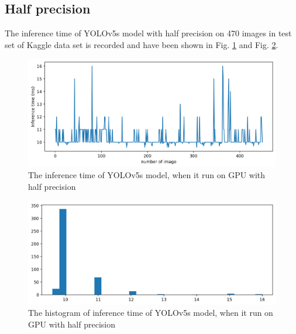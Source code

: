 \documentclass[12pt,a4paper]{article}
\begin{document}
\subsection*{Half precision}
The inference time of YOLOv5s model with half precision on 470 images in test set of Kaggle data set is recorded and have been shown in Fig. \ref{fig: gpush} and Fig. \ref{fig: gpush_hist}.
\begin{figure}[H]
    \centering
    \includegraphics[width=15cm]{figures/Inftime_yolov5s_half.png}
    \caption{The inference time of YOLOv5s model, when it run on GPU with half precision}
    \label{fig: gpush}
\end{figure}
\begin{figure}[H]
    \centering
    \includegraphics[width=15cm]{figures/Inftime_yolov5s_half_hist.png}
    \caption{The histogram of inference time of YOLOv5s model, when it run on GPU with half precision}
    \label{fig: gpush_hist}
\end{figure}
\end{document}
